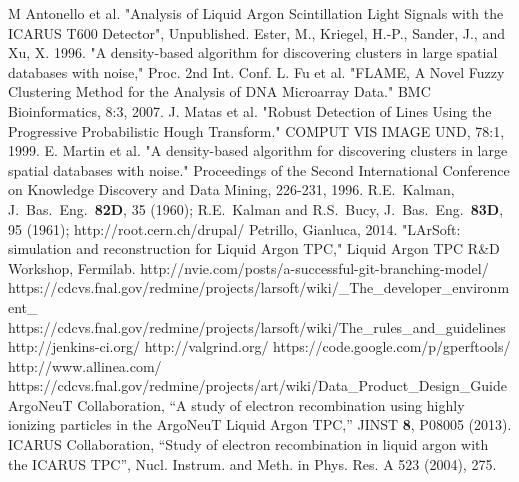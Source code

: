 \documentclass[12pt]{elsarticle}
\begin{document}
\begin{thebibliography}{99}
 M Antonello et al.  "Analysis of Liquid Argon Scintillation Light Signals with the ICARUS T600 Detector", Unpublished.
 Ester, M., Kriegel, H.-P., Sander, J., and Xu, X. 1996. "A density-based algorithm for discovering clusters in large spatial databases with noise," Proc. 2nd Int. Conf.
 L. Fu et al. "FLAME, A Novel Fuzzy Clustering Method for the Analysis of DNA Microarray Data." BMC Bioinformatics, 8:3, 2007.
 J. Matas et al. "Robust Detection of Lines Using the Progressive Probabilistic Hough Transform." COMPUT VIS IMAGE UND, 78:1, 1999.
 E. Martin et al. "A density-based algorithm for discovering clusters in large spatial databases with noise." Proceedings of the Second International Conference on Knowledge Discovery and Data Mining, 226-231, 1996. 
R.E.~Kalman, J.~Bas.~Eng.~{\bf 82D}, 35 (1960);
R.E.~Kalman and R.S.~Bucy, J.~Bas.~Eng.~{\bf 83D}, 95 (1961);
 http://root.cern.ch/drupal/
 Petrillo, Gianluca, 2014. "LArSoft: simulation and reconstruction for Liquid Argon TPC," Liquid Argon TPC R\&D Workshop, Fermilab.
 http://nvie.com/posts/a-successful-git-branching-model/
 https://cdcvs.fnal.gov/redmine/projects/larsoft/wiki/\_The\_developer\_environment\_
 https://cdcvs.fnal.gov/redmine/projects/larsoft/wiki/The\_rules\_and\_guidelines
 http://jenkins-ci.org/
 http://valgrind.org/
 https://code.google.com/p/gperftools/
 http://www.allinea.com/
 https://cdcvs.fnal.gov/redmine/projects/art/wiki/Data\_Product\_Design\_Guide
 ArgoNeuT Collaboration, ``A study of electron recombination using highly ionizing particles in the ArgoNeuT Liquid Argon TPC,'' JINST {\bf 8}, P08005 (2013).
 ICARUS Collaboration, ``Study of electron recombination in liquid argon with the ICARUS TPC'', Nucl. Instrum. and Meth. in Phys. Res. A 523 (2004), 275.
\end{thebibliography}
\clearpage 
\end{document}
